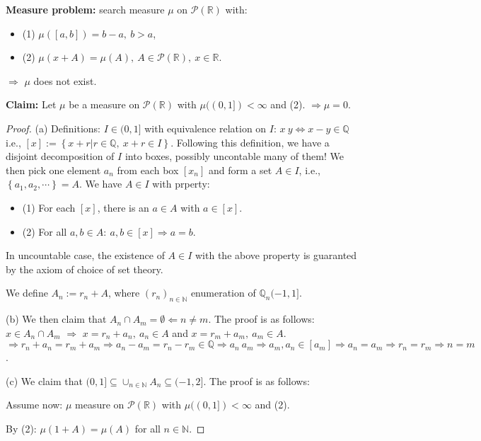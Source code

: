 \documentclass[../../note.tex]{subfiles}
\begin{document}
\textbf{Measure problem:} search measure $\mu$ on $\mathcal{P}(\mathbb{R})$ with:
\begin{itemize}
    \item (1) $\mu([a, b]) = b - a,~b > a$,
    \item (2) $\mu(x+A) = \mu(A),~A \in \mathcal{P}(\mathbb{R}),~x \in \mathbb{R}$.
\end{itemize}
$\Longrightarrow$ $\mu$ does not exist.

\textbf{Claim:} Let $\mu$ be a measure on $\mathcal{P}(\mathbb{R})$ with $\mu((0, 1])<\infty$ and (2). $\Longrightarrow \mu = 0.$
\begin{proof}
    (a) Definitions: $I \in (0,1]$ with equivalence relation on $I$: $x ~ y \Longleftrightarrow x - y \in \mathbb{Q}$ i.e., $[x]:= \left\{x+r \vert r \in \mathbb{Q},~ x+r \in I \right\}$. Following this definition, we have a disjoint decomposition of $I$ into boxes, possibly uncontable many of them! We then pick one element $a_n$ from each box $[x_n]$ and form a set $A \in I$, i.e., $\left\{a_1, a_2, \cdots \right\} = A$. We have $A \in I$ with prperty:
    \begin{itemize}
        \item (1) For each $[x]$, there is an $a \in A$ with $a \in [x]$.
        \item (2) For all $a, b \in A:~a,b \in [x]\Longrightarrow a=b$.
    \end{itemize} 
    In uncountable case, the existence of $A \in I$ with the above property is guaranted by the axiom of choice of set theory.

    We define $A_n:= r_n + A$, where $(r_n)_{n \in \mathbb{N}}$ enumeration of $\mathbb{Q}_n(-1, 1]$. 
    
    (b) We then claim that $A_n \cap A_m = \emptyset \Longleftarrow n \neq m$. The proof is as follows: $x \in A_n \cap A_m$ $\Longrightarrow$ $x= r_n + a_n,~ a_n \in A$ and $x= r_m + a_m,~ a_m \in A$. $\Longrightarrow r_n + a_n = r_m + a_m \Longrightarrow a_n-a_m = r_n-r_m \in \mathbb{Q} \Longrightarrow a_n~a_m \Longrightarrow a_m, a_n \in [a_m] \Longrightarrow a_n = a_m \Longrightarrow r_n=r_m \Longrightarrow n=m$.

    (c) We claim that $(0,1] \subseteq \cup_{n \in \mathbb{N}} A_n \subseteq (-1, 2]$. The proof is as follows:

    Assume now: $\mu$ measure on $\mathcal{P}(\mathbb{R})$ with $\mu ((0,1])< \infty $ and (2).

    By (2): $\mu(1+A) = \mu(A)$ for all $n \in \mathbb{N}$.


\end{proof}
\end{document}
